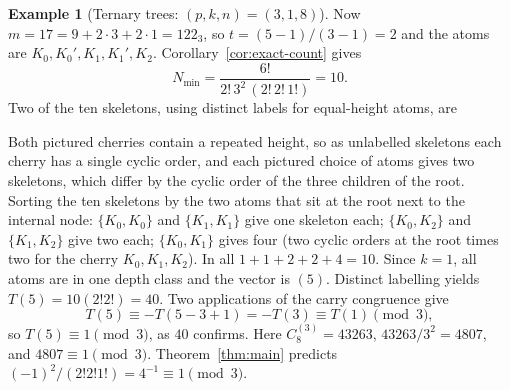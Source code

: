 \documentclass[11pt]{amsart}
\theoremstyle{definition}
\newtheorem{example}[theorem]{Example}
\theoremstyle{remark}
\begin{document}
\begin{example}[Ternary trees: $(p,k,n)=(3,1,8)$]\label{ex:ternary}
Now $m=17=9+2\cdot3+2\cdot1=122_3$, so $t=(5-1)/(3-1)=2$ and the atoms are $K_0,K_0',K_1,K_1',K_2$.  Corollary~\ref{cor:exact-count} gives
\[
 N_{\min}=\frac{6!}{2!\,3^2\,(2!\,2!\,1!)}=10.
\]
Two of the ten skeletons, using distinct labels for equal-height atoms, are
\begin{center}
\qquad
{}
\end{center}
Both pictured cherries contain a repeated height, so as unlabelled skeletons each cherry has a single cyclic order, and each pictured choice of atoms gives two skeletons, which differ by the cyclic order of the three children of the root.  Sorting the ten skeletons by the two atoms that sit at the root next to the internal node: $\{K_0,K_0\}$ and $\{K_1,K_1\}$ give one skeleton each; $\{K_0,K_2\}$ and $\{K_1,K_2\}$ give two each; $\{K_0,K_1\}$ gives four (two cyclic orders at the root times two for the cherry $K_0,K_1,K_2$).  In all $1+1+2+2+4=10$.  Since $k=1$, all atoms are in one depth class and the vector is $(5)$.  Distinct labelling yields $T(5)=10(2!2!)=40$.  Two applications of the carry congruence give
\[
 T(5)\equiv-T(5-3+1)=-T(3)\equiv T(1)\pmod3,
\]
so $T(5)\equiv1\pmod3$, as $40$ confirms.  Here $C_8^{(3)}=43263$, $43263/3^2=4807$, and $4807\equiv1\pmod3$.  Theorem~\ref{thm:main} predicts $(-1)^2/(2!2!1!)=4^{-1}\equiv1\pmod3$.
\end{example}
\end{document}
